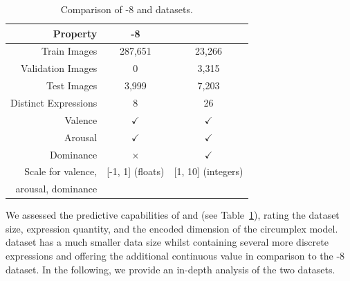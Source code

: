 \begin{table}[t]
\centering
\begin{tabular}{ r | c | c }
\hline
 \textbf{Property} & \textbf{\affectnet{}-8} & \textbf{\emotic{}} \\ 
\hline
 Train Images & 287,651 & 23,266 \\
 Validation Images & 0 & 3,315 \\
 Test Images & 3,999 & 7,203 \\
 Distinct Expressions & 8 & 26 \\
 Valence & $\checkmark$ & $\checkmark$ \\
 Arousal & $\checkmark$ & $\checkmark$ \\
 Dominance & $\times$ & $\checkmark$\\
 Scale for valence, & [-1, 1] (floats) & [1, 10] (integers) \\
 arousal, dominance & & \\ \hline
\end{tabular}
\caption{Comparison of \affectnet{}-8 and \emotic{} datasets.}
\label{tab:dataset_properties}
\end{table}

We assessed the predictive capabilities of \affectnet{} and \emotic{} (see Table~\ref{tab:dataset_properties}), rating the dataset size, expression quantity, and the encoded dimension of the circumplex model. \emotic{} dataset has a much smaller data size whilst containing several more discrete expressions and offering the additional continuous value \dom{} in comparison to the \affectnet{}-8 dataset.  In the following, we provide an in-depth analysis of the two datasets.


